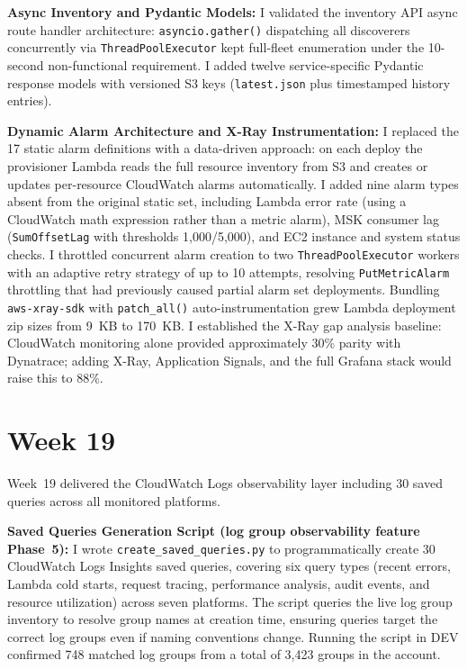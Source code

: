 \textbf{Async Inventory and Pydantic Models:} 
I validated the inventory API
async route handler architecture: \texttt{asyncio.gather()}
dispatching all discoverers concurrently via \texttt{ThreadPoolExecutor}
kept full-fleet enumeration under the 10-second non-functional requirement.
I added twelve service-specific Pydantic response models with versioned
S3 keys (\texttt{latest.json} plus timestamped history entries).

\textbf{Dynamic Alarm Architecture and X-Ray Instrumentation:} 
I replaced the 17 static alarm definitions with a
data-driven approach: on each deploy the provisioner Lambda reads the full resource inventory
from S3 and creates or updates per-resource CloudWatch alarms automatically.
I added nine alarm types absent from the original static set, including
Lambda error rate (using a CloudWatch math expression rather than a metric
alarm), MSK consumer lag (\texttt{SumOffsetLag} with thresholds 1,000/5,000),
and EC2 instance and system status checks. I throttled concurrent alarm creation to two \texttt{ThreadPoolExecutor} workers with an adaptive retry
strategy of up to 10 attempts, resolving \texttt{PutMetricAlarm} throttling
that had previously caused partial alarm set deployments. Bundling \texttt{aws-xray-sdk} with \texttt{patch\_all()} auto-instrumentation grew Lambda deployment
zip sizes from 9~KB to 170~KB. I established the X-Ray gap analysis baseline: CloudWatch monitoring alone provided
approximately 30\% parity with Dynatrace; adding X-Ray, Application
Signals, and the full Grafana stack would raise this to 88\%.


\FloatBarrier

\section{Week 19}
\label{sec:week19}

Week~19 delivered the CloudWatch Logs observability layer including 30
saved queries across all monitored platforms.

\textbf{Saved Queries Generation Script (log group observability feature Phase~5):} 
I wrote \texttt{create\_saved\_queries.py} to programmatically create
30 CloudWatch Logs Insights saved queries, covering six query types
(recent errors, Lambda cold starts, request tracing, performance analysis,
audit events, and resource utilization) across seven platforms. The script
queries the live log group inventory to resolve group names at creation
time, ensuring queries target the correct log groups even if naming
conventions change. Running the script in DEV confirmed 748 matched log
groups from a total of 3,423 groups in the account.

